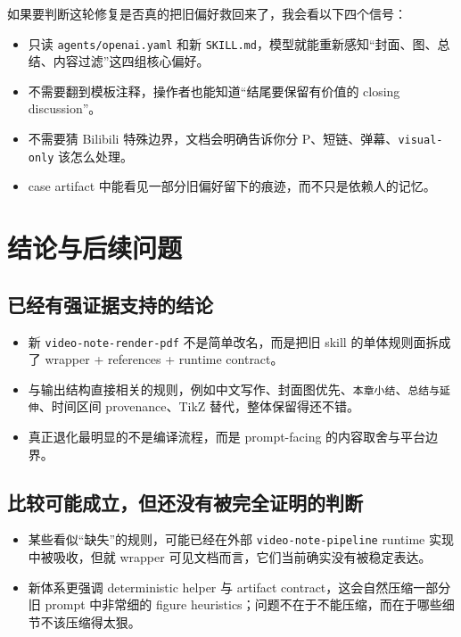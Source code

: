 \documentclass[a4paper]{article}
\begin{document}
如果要判断这轮修复是否真的把旧偏好救回来了，我会看以下四个信号：

\begin{itemize}
\item 只读 \texttt{agents/openai.yaml} 和新 \texttt{SKILL.md}，模型就能重新感知“封面、图、总结、内容过滤”这四组核心偏好。
\item 不需要翻到模板注释，操作者也能知道“结尾要保留有价值的 closing discussion”。
\item 不需要猜 Bilibili 特殊边界，文档会明确告诉你分 P、短链、弹幕、\texttt{visual-only} 该怎么处理。
\item case artifact 中能看见一部分旧偏好留下的痕迹，而不只是依赖人的记忆。
\end{itemize}

\section{结论与后续问题}

\subsection{已经有强证据支持的结论}

\begin{itemize}
\item 新 \texttt{video-note-render-pdf} 不是简单改名，而是把旧 skill 的单体规则面拆成了 wrapper + references + runtime contract。
\item 与输出结构直接相关的规则，例如中文写作、封面图优先、\texttt{本章小结}、\texttt{总结与延伸}、时间区间 provenance、TikZ 替代，整体保留得还不错。
\item 真正退化最明显的不是编译流程，而是 prompt-facing 的内容取舍与平台边界。
\end{itemize}

\subsection{比较可能成立，但还没有被完全证明的判断}

\begin{itemize}
\item 某些看似“缺失”的规则，可能已经在外部 \texttt{video-note-pipeline} runtime 实现中被吸收，但就 wrapper 可见文档而言，它们当前确实没有被稳定表达。
\item 新体系更强调 deterministic helper 与 artifact contract，这会自然压缩一部分旧 prompt 中非常细的 figure heuristics；问题不在于不能压缩，而在于哪些细节不该压缩得太狠。
\end{itemize}
\end{document}
